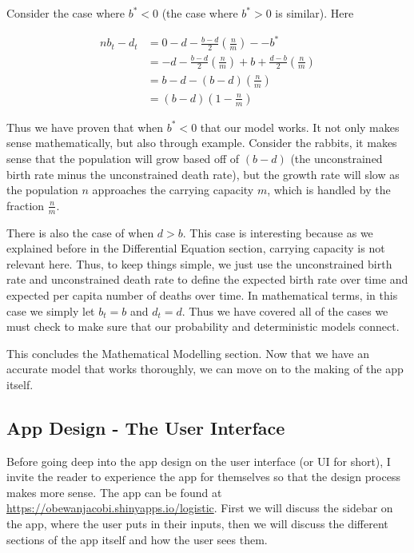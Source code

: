 \documentclass{article}\usepackage[]{graphicx}\usepackage[]{color}
\begin{document}
Consider the case where \(b^* < 0\) (the case where \(b^* > 0\) is similar). Here

\begin{equation}
\begin{split}
nb_t - d_t & = 0 - d - \frac{b-d}{2} \left(\frac{n}{m}\right)- -b^* \\ 
& = -d-\frac{b-d}{2} \left(\frac{n}{m}\right) +b + \frac{d-b}{2} \left(\frac{n}{m}\right) \\
& = b-d-(b-d)\left(\frac{n}{m}\right) \\
& =(b-d)\left(1-\frac{n}{m}\right)
\end{split}
\end{equation}

\noindent Thus we have proven that when \(b^* < 0\) that our model works. It not only makes sense mathematically, but also through example. Consider the rabbits, it makes sense that the population will grow based off of \((b-d)\) (the unconstrained birth rate minus the unconstrained death rate), but the growth rate will slow as the population \(n\) approaches the carrying capacity \(m\), which is handled by the fraction \(\frac{n}{m}\). 

There is also the case of when \(d>b\). This case is interesting because as we explained before in the Differential Equation section, carrying capacity is not relevant here. Thus, to keep things simple, we just use the unconstrained birth rate and unconstrained death rate to define the expected birth rate over time and expected per capita number of deaths over time. In mathematical terms, in this case we simply let \(b_t = b\) and \(d_t=d\). Thus we have covered all of the cases we must check to make sure that our probability and deterministic models connect. 

This concludes the Mathematical Modelling section. Now that we have an accurate model that works thoroughly, we can move on to the making of the app itself. 










\subsection{App Design - The User Interface}

Before going deep into the app design on the user interface (or UI for short), I invite the reader to experience the app for themselves so that the design process makes more sense. The app can be found at \url{https://obewanjacobi.shinyapps.io/logistic}. First we will discuss the sidebar on the app, where the user puts in their inputs, then we will discuss the different sections of the app itself and how the user sees them.
\end{document}
